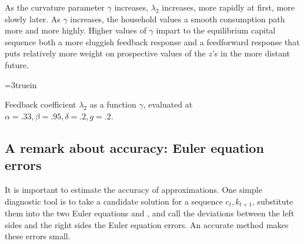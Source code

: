 As the curvature parameter $\gamma$ increases, $\lambda_2$
increases, more  rapidly at first, more slowly later. As $\gamma$
increases, the household values a smooth consumption path more and
more highly. Higher values of $\gamma$ impart to  the equilibrium
capital sequence  both a more sluggish feedback response and a
feedforward response that puts relatively more weight on
prospective  values of the $z$'s in the more distant future.


\centerline{\epsfxsize=3truein}
\caption{Feedback coefficient $\lambda_2$ as a function
$\gamma$, evaluated at $\alpha=.33, \beta=.95, \delta=.2, g=.2$.}
\endfigure

\subsection{A remark about accuracy: Euler equation errors}\label{sec:accuracy}%
It is important to estimate the accuracy of approximations.  One
simple diagnostic tool is to  take a candidate solution for a
sequence $c_t, k_{t+1}$, substitute them into the two Euler
equations  and , and call the deviations
between the left sides and the right sides the Euler equation
errors.  An accurate method makes these
errors small.
%
%
%



